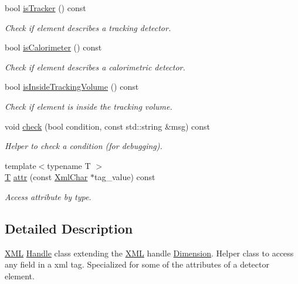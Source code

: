 \begin{DoxyCompactItemize}
bool \hyperlink{struct_d_d4hep_1_1_x_m_l_1_1_det_element_a3e0b3b6cf5350fe0eba2ea16eab04736}{isTracker} () const 
\begin{DoxyCompactList}\small\item\em Check if element describes a tracking detector. \item\end{DoxyCompactList}\item 
bool \hyperlink{struct_d_d4hep_1_1_x_m_l_1_1_det_element_a43510a1404429db0c01fc1e847c98ec9}{isCalorimeter} () const 
\begin{DoxyCompactList}\small\item\em Check if element describes a calorimetric detector. \item\end{DoxyCompactList}\item 
bool \hyperlink{struct_d_d4hep_1_1_x_m_l_1_1_det_element_a467c07e590ae2d7162c66d3472e9215b}{isInsideTrackingVolume} () const 
\begin{DoxyCompactList}\small\item\em Check if element is inside the tracking volume. \item\end{DoxyCompactList}\item 
void \hyperlink{struct_d_d4hep_1_1_x_m_l_1_1_det_element_a1793225434c30cfa857059eb14fe5240}{check} (bool condition, const std::string \&msg) const 
\begin{DoxyCompactList}\small\item\em Helper to check a condition (for debugging). \item\end{DoxyCompactList}\item 
{\footnotesize template$<$typename T $>$ }\\\hyperlink{class_t}{T} \hyperlink{struct_d_d4hep_1_1_x_m_l_1_1_det_element_a67cb642288a9c27ca09a1755ee92e994}{attr} (const \hyperlink{namespace_d_d4hep_1_1_x_m_l_a09e5d9cc86ed782f6826dfe0778c1815}{XmlChar} $\ast$tag\_\-value) const 
\begin{DoxyCompactList}\small\item\em Access attribute by type. \item\end{DoxyCompactList}\end{DoxyCompactItemize}


\subsection{Detailed Description}
\hyperlink{namespace_d_d4hep_1_1_x_m_l}{XML} \hyperlink{class_d_d4hep_1_1_handle}{Handle} class extending the \hyperlink{namespace_d_d4hep_1_1_x_m_l}{XML} handle \hyperlink{struct_d_d4hep_1_1_x_m_l_1_1_dimension}{Dimension}. Helper class to access any field in a xml tag. Specialized for some of the attributes of a detector element.


